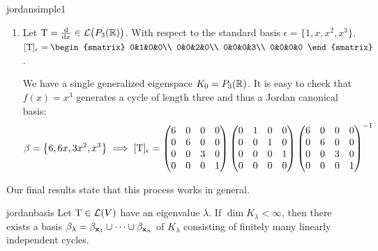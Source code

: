 \begin{examples}{}{jordansimple1}
\begin{enumerate}
		\item Let $\mathrm{T}=\frac{\mathrm{d} }{\mathrm{d} x}\in\mathcal{L}\big(P_3(\mathbb{R})\big)$. With respect to the standard basis $\epsilon=\{1,x,x^2,x^3\}$, $[\rT]_\epsilon=
		\begin{smatrix}
			0&1&0&0\\
			0&0&2&0\\
			0&0&0&3\\
			0&0&0&0
		\end{smatrix}$.\par
		We have a single generalized eigenspace $K_0=P_3(\mathbb{R})$. It is easy to check that $f(x)=x^3$ generates a cycle of length three and thus a Jordan canonical basis:
		\[
			\beta=\big\{6,6x,3x^2,x^3\big\}
			\implies[\mathrm{T}]_\epsilon =
			\begin{pmatrix}
				6&0&0&0\\
				0&6&0&0\\
				0&0&3&0\\
				0&0&0&1
			\end{pmatrix}
			\begin{pmatrix}
				0&1&0&0\\
				0&0&1&0\\
				0&0&0&1\\
				0&0&0&0
			\end{pmatrix}
			\begin{pmatrix}
				6&0&0&0\\
				0&6&0&0\\
				0&0&3&0\\
				0&0&0&1
			\end{pmatrix}
			^{-1}
		\]
	\end{enumerate}
\end{examples}


\pagebreak[3]


Our final results state that this process works in general.

\begin{thm}{}{jordanbasis}
	Let $\mathrm{T}\in\mathcal{L}(V)$ have an eigenvalue $\lambda$. If $\dim K_\lambda<\infty$, then there exists a basis $\beta_\lambda=\beta_{{\mathbf{x}}_1}\cup\cdots\cup\beta_{{\mathbf{x}}_n}$ of $K_\lambda$ consisting of finitely many linearly independent cycles.
\end{thm}

